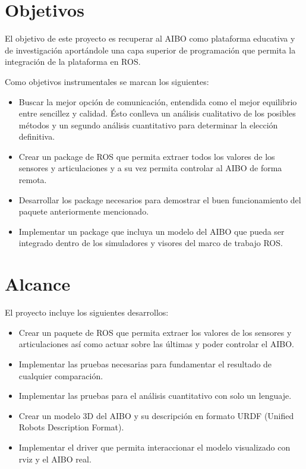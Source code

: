 \documentclass[12pt,a4paper,final,twoside]{book}
\begin{document}
\section{Objetivos}
El objetivo de este proyecto es recuperar al AIBO como plataforma educativa y de investigación aportándole una capa superior de programación que permita la integración de la plataforma en ROS.


Como objetivos instrumentales se marcan los siguientes:
\begin{itemize}
\item Buscar la mejor opción de comunicación, entendida como el mejor equilibrio entre sencillez y calidad. Ésto conlleva un análisis cualitativo de los posibles métodos y un segundo análisis cuantitativo para determinar la elección definitiva.

\item Crear un package de ROS que permita extraer todos los valores de los sensores y articulaciones y a su vez permita controlar al AIBO de forma remota.

\item Desarrollar los package necesarios para demostrar el buen funcionamiento del paquete anteriormente mencionado.

\item Implementar un package que incluya un modelo del AIBO que pueda ser integrado dentro de los simuladores y visores del marco de trabajo ROS. 
\end{itemize}

\section{Alcance}
El proyecto incluye los siguientes desarrollos:
\begin{itemize}
\item Crear un paquete de ROS que permita extraer los valores de los sensores y articulaciones así como actuar sobre las últimas y poder controlar el AIBO.
\item Implementar las pruebas necesarias para fundamentar el resultado de cualquier comparación.
\item Implementar las pruebas para el análisis cuantitativo con solo un lenguaje.
\item Crear un modelo 3D del AIBO y su descripción en formato URDF (Unified Robots Description Format).
\item Implementar el driver que permita interaccionar el modelo visualizado con rviz y el AIBO real.
\end{itemize} 
\end{document}
